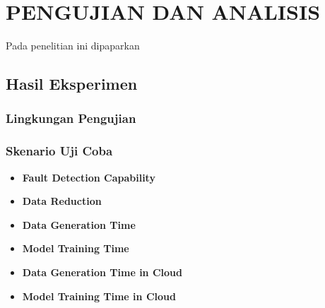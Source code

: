 \chapter{PENGUJIAN DAN ANALISIS}
\label{chap:pengujiananalisis}



Pada penelitian ini dipaparkan \lipsum[1][1-5]

\section{Hasil Eksperimen}
\label{sec:hasilpengujian}

\subsection{Lingkungan Pengujian}
\label{subsec:lingkunganpengujian}

\lipsum[1]

\subsection{Skenario Uji Coba}
\label{subsec:skenarioujicoba}

\lipsum[2]

\begin{itemize}
  \item \textbf{Fault Detection Capability} \\
        \lipsum[3]
  \item \textbf{Data Reduction} \\
        \lipsum[4]
  \item \textbf{Data Generation Time} \\
        \lipsum[5]
  \item \textbf{Model Training Time} \\
        \lipsum[6]
  \item \textbf{Data Generation Time in Cloud} \\
        \lipsum[7]
  \item \textbf{Model Training Time in Cloud} \\
        \lipsum[8]
\end{itemize}

